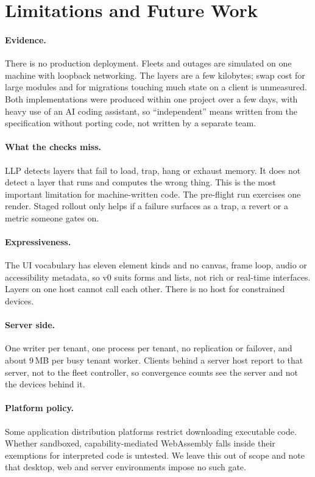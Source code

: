 \documentclass[10pt,twocolumn]{article}
\begin{document}
\section{Limitations and Future Work}
\label{sec:limits}

\paragraph{Evidence.} There is no production deployment. Fleets and outages are simulated on one
machine with loopback networking. The layers are a few kilobytes; swap cost for large modules and
for migrations touching much state on a client is unmeasured. Both implementations were produced
within one project over a few days, with heavy use of an AI coding assistant, so ``independent''
means written from the specification without porting code, not written by a separate team.

\paragraph{What the checks miss.} LLP detects layers that fail to load, trap, hang or exhaust
memory. It does not detect a layer that runs and computes the wrong thing. This is the most
important limitation for machine-written code. The pre-flight run exercises one render. Staged
rollout only helps if a failure surfaces as a trap, a revert or a metric someone gates on.

\paragraph{Expressiveness.} The UI vocabulary has eleven element kinds and no canvas, frame loop,
audio or accessibility metadata, so v0 suits forms and lists, not rich or real-time interfaces.
Layers on one host cannot call each other. There is no host for constrained devices.

\paragraph{Server side.} One writer per tenant, one process per tenant, no replication or
failover, and about 9\,MB per busy tenant worker. Clients behind a server host report to that
server, not to the fleet controller, so convergence counts see the server and not the devices
behind it.

\paragraph{Platform policy.} Some application distribution platforms restrict downloading
executable code. Whether sandboxed, capability-mediated WebAssembly falls inside their exemptions
for interpreted code is untested. We leave this out of scope and note that desktop, web and server
environments impose no such gate.
\end{document}
